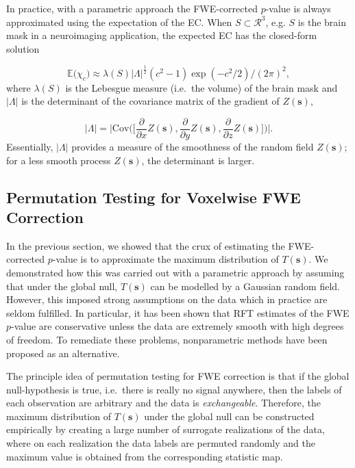In practice, with a parametric approach the FWE-corrected $p$-value is always approximated using the expectation of the EC. When $S \subset \mathcal{R}^{3}$,  e.g. $S$ is the brain mask in a neuroimaging application, the expected EC has the closed-form solution 

\begin{equation}
\label{eq:EC_closed_form_approx}
\mathbb{E}\Big(\chi_{c} \Big) \approx \lambda(S)|\Lambda|^{\frac{1}{2}}(c^{2} - 1)\exp{(- c^{2}/2)}/(2\pi)^{2},
\end{equation}
where $\lambda(S)$ is the Lebesgue measure (i.e.\ the volume) of the brain mask and $|\Lambda|$ is the determinant of the covariance matrix of the gradient of $Z(\bm{s})$,

\begin{equation}
\label{Lamda_determinant}
|\Lambda| = \Bigg|\mathrm{Cov}\bigg(\bigg[\frac{\partial}{\partial x}Z(\bm{s}), \frac{\partial}{\partial y}Z(\bm{s}), \frac{\partial}{\partial z}Z(\bm{s})\bigg]\bigg)\Bigg|.
\end{equation}
Essentially, $|\Lambda|$ provides a measure of the smoothness of the random field $Z(\bm{s})$; for a less smooth process $Z(\bm{s})$, the determinant is  larger. 


\subsection{Permutation Testing for Voxelwise FWE Correction}

In the previous section, we showed that the crux of estimating the FWE-corrected $p$-value is to approximate the maximum distribution of $T(\bm{s})$. We demonstrated how this was carried out with a parametric approach by assuming that under the global null, $T(\bm{s})$ can be modelled by a Gaussian random field. However, this imposed strong assumptions on the data which in practice are seldom fulfilled. In particular, it has been shown that RFT estimates of the FWE $p$-value are conservative unless the data are extremely smooth with high degrees of freedom. To remediate these problems, nonparametric methods have been proposed as an alternative.

The principle idea of permutation testing for FWE correction is that if the global null-hypothesis is true, i.e.\ there is really no signal anywhere, then the labels of each observation are arbitrary and the data is \textit{exchangeable}. Therefore, the maximum distribution of $T(\bm{s})$ under the global null can be constructed empirically by creating a large number of surrogate realizations of the data, where on each realization the data labels are permuted randomly and the maximum value is obtained from the corresponding statistic map. 

